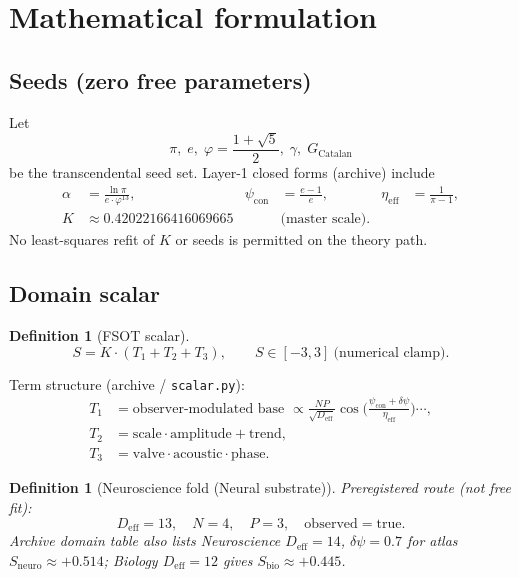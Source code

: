 \documentclass[11pt,a4paper]{article}
\newtheorem{definition}[theorem]{Definition}
\begin{document}
\section{Mathematical formulation}
\label{sec:math}

\subsection{Seeds (zero free parameters)}
\label{sec:seeds}

Let
\[
\pi,\; e,\; \varphi=\frac{1+\sqrt{5}}{2},\; \gamma,\; G_{\mathrm{Catalan}}
\]
be the transcendental seed set. Layer-1 closed forms (archive) include
\begin{align}
\alpha &= \frac{\ln\pi}{e\cdot\varphi^{13}}, &
\psi_{\mathrm{con}} &= \frac{e-1}{e}, &
\eta_{\mathrm{eff}} &= \frac{1}{\pi-1}, \\
K &\approx 0.42022166416069665 & &\text{(master scale)}.
\end{align}
No least-squares refit of \(K\) or seeds is permitted on the theory path.

\subsection{Domain scalar}
\label{sec:scalar}

\begin{definition}[FSOT scalar]
\[
S = K\cdot(T_1+T_2+T_3),\qquad S\in[-3,3]\ \text{(numerical clamp)}.
\]
\end{definition}
Term structure (archive / \texttt{scalar.py}):
\begin{align}
T_1 &= \text{observer-modulated base }\propto \frac{NP}{\sqrt{D_{\mathrm{eff}}}}\cos\!\Big(\frac{\psi_{\mathrm{con}}+\delta\psi}{\eta_{\mathrm{eff}}}\Big)\cdots,\\
T_2 &= \mathrm{scale}\cdot\mathrm{amplitude}+\mathrm{trend},\\
T_3 &= \mathrm{valve}\cdot\mathrm{acoustic}\cdot\mathrm{phase}.
\end{align}

\begin{definition}[Neuroscience fold (Neural substrate)]
Preregistered route (not free fit):
\[
D_{\mathrm{eff}}=13,\quad N=4,\quad P=3,\quad \mathrm{observed}=\mathrm{true}.
\]
Archive domain table also lists Neuroscience \(D_{\mathrm{eff}}=14\), \(\delta\psi=0.7\) for
atlas \(S_{\mathrm{neuro}}\approx +0.514\); Biology \(D_{\mathrm{eff}}=12\) gives
\(S_{\mathrm{bio}}\approx +0.445\).
\end{definition}
\end{document}
